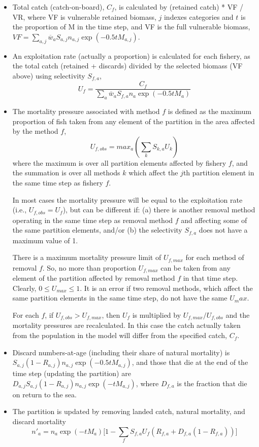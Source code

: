 \begin{itemize}
    \item Total catch (catch-on-board), $C_{f}$, is calculated by (retained catch) * VF / VR, where VF is vulnerable retained biomass, $j$ indexes categories and $t$ is the proportion of M in the time step, and VF is the full vulnerable biomass, $VF = \sum_{a,j} \overline{w}_{a} S_{a,j} n_{a,j} \exp(-0.5 t M_{a,j})$.

    \item An exploitation rate (actually a proportion) is calculated for each fishery, as the total catch (retained + discards) divided by the selected biomass (VF above) using selectivity $S_{f,a}$,
        $$ U_f = \frac{C_f}{\sum_a \bar{w}_a S_{f,a} n_a \exp(-0.5 t M_{a})}$$

    \item The mortality pressure associated with method $f$ is defined as the maximum proportion of fish taken from any element of the partition in the area affected by the method $f$,
        $$ U_{f,obs} = max_a (\sum_k S_{k,a} U_k) $$
    where the maximum is over all partition elements affected by fishery $f$, and the summation is over all methods $k$ which affect the $j$th partition element in the same time step as fishery $f$.

    In most cases the mortality pressure will be equal to the exploitation rate (i.e., $U_{f,obs} = U_f$), but can be different if: (a) there is another removal method operating in the same time step as removal method $f$ and affecting some of the same partition elements, and/or (b) the selectivity $S_{f,a}$ does not have a maximum value of 1.

    There is a maximum mortality pressure limit of $U_{f,max}$ for each method of removal $f$. So, no more than proportion $U_{f,max}$ can be taken from any element of the partition affected by removal method $f$ in that time step. Clearly, $0 \leq U_{max} \leq 1$. It is an error if two removal methods, which affect the same partition elements in the same time step, do not have the same $U_max$.

    For each $f$, if $U_{f,obs} > U_{f,max}$, then $U_f$ is multiplied by $U_{f,max}/U_{f,obs}$ and the mortality pressures are recalculated. In this case the catch actually taken from the population in the model will differ from the specified catch, $C_f$.

    \item Discard numbers-at-age (including their share of natural mortality) is $S_{a,j} (1 - R_{a,j}) n_{a,j} \exp(-0.5 t M_{a,j})$, and those that die at the end of the time step (updating the partition) are $D_{a,j} S_{a,j} (1 - R_{a,j}) n_{a,j} \exp(-t M_{a,j})$, where $D_{f,a}$ is the fraction that die on return to the sea.

    \item The partition is updated by removing landed catch, natural mortality, and discard mortality
        $$ n'_{a} = n_{a} \exp(-t M_a) \big[ 1 - \sum_f S_{f,a} U_f (R_{f,a} + D_{f,a} (1 - R_{f,a})) \big] $$
\end{itemize}

